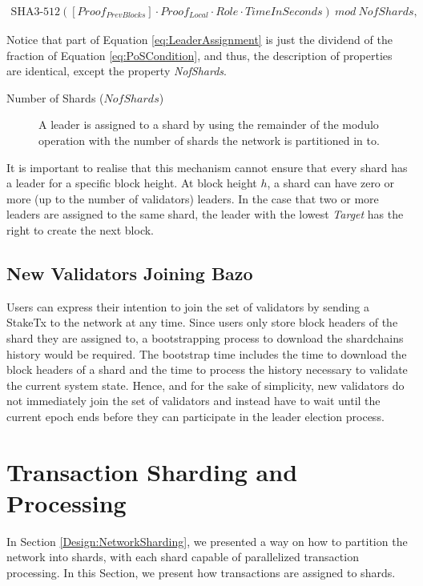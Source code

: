\begin{gather}
\label{eq:LeaderAssignment}
  \text{SHA3-512}([Proof_{PrevBlocks}] \cdot Proof_{Local} \cdot Role \cdot TimeInSeconds)\ mod\ NofShards,
\end{gather}

\noindent Notice that part of Equation \ref{eq:LeaderAssignment} is just the dividend of the fraction of Equation \ref{eq:PoSCondition}, and thus, the description of properties are identical, except the property \textit{NofShards}.

\begin{description}
  \item[Number of Shards ($NofShards$)] A leader is assigned to a shard by using the remainder of the modulo operation with the number of shards the network is partitioned in to.
\end{description}

It is important to realise that this mechanism cannot ensure that every shard has a leader for a specific block height. At block height $h$, a shard can have zero or more (up to the number of validators) leaders. In the case that two or more leaders are assigned to the same shard, the leader with the lowest \textit{Target} has the right to create the next block. 

\subsection{New Validators Joining Bazo}

Users can express their intention to join the set of validators by sending a StakeTx to the network at any time. Since users only store block headers of the shard they are assigned to, a bootstrapping process to download the shardchains history would be required. The bootstrap time includes the time to download the block headers of a shard and the time to process the history necessary to validate the current system state. Hence, and for the sake of simplicity, new validators do not immediately join the set of validators and instead have to wait until the current epoch ends before they can participate in the leader election process.

\section{Transaction Sharding and Processing}
\label{Design:TransactionSharding}

In Section \ref{Design:NetworkSharding}, we presented a way on how to partition the network into shards, with each shard capable of parallelized transaction processing. In this Section, we present how transactions are assigned to shards.

